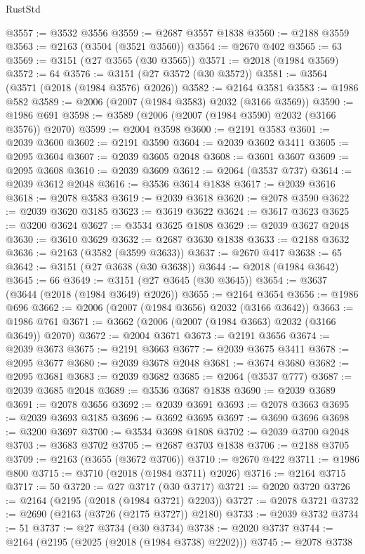 \begin{lexlean}{RustStd}
\begin{coremodule}
@3557 := @3532 @3556
@3559 := @2687 @3557 @1838
@3560 := @2188 @3559
@3563 := @2163 (@3504 (@3521 @3560))
@3564 := @2670 @402
@3565 := 63
@3569 := @3151 (@27 @3565 (@30 @3565))
@3571 := @2018 (@1984 @3569)
@3572 := 64
@3576 := @3151 (@27 @3572 (@30 @3572))
@3581 := @3564 (@3571 (@2018 (@1984 @3576) @2026))
@3582 := @2164 @3581
@3583 := @1986 @582
@3589 := @2006 (@2007 (@1984 @3583) @2032 (@3166 @3569))
@3590 := @1986 @691
@3598 := @3589 (@2006 (@2007 (@1984 @3590) @2032 (@3166 @3576)) @2070)
@3599 := @2004 @3598
@3600 := @2191 @3583
@3601 := @2039 @3600
@3602 := @2191 @3590
@3604 := @2039 @3602 @3411
@3605 := @2095 @3604
@3607 := @2039 @3605 @2048
@3608 := @3601 @3607
@3609 := @2095 @3608
@3610 := @2039 @3609
@3612 := @2064 (@3537 @737)
@3614 := @2039 @3612 @2048
@3616 := @3536 @3614 @1838
@3617 := @2039 @3616
@3618 := @2078 @3583
@3619 := @2039 @3618
@3620 := @2078 @3590
@3622 := @2039 @3620 @3185
@3623 := @3619 @3622
@3624 := @3617 @3623
@3625 := @3200 @3624
@3627 := @3534 @3625 @1808
@3629 := @2039 @3627 @2048
@3630 := @3610 @3629
@3632 := @2687 @3630 @1838
@3633 := @2188 @3632
@3636 := @2163 (@3582 (@3599 @3633))
@3637 := @2670 @417
@3638 := 65
@3642 := @3151 (@27 @3638 (@30 @3638))
@3644 := @2018 (@1984 @3642)
@3645 := 66
@3649 := @3151 (@27 @3645 (@30 @3645))
@3654 := @3637 (@3644 (@2018 (@1984 @3649) @2026))
@3655 := @2164 @3654
@3656 := @1986 @696
@3662 := @2006 (@2007 (@1984 @3656) @2032 (@3166 @3642))
@3663 := @1986 @761
@3671 := @3662 (@2006 (@2007 (@1984 @3663) @2032 (@3166 @3649)) @2070)
@3672 := @2004 @3671
@3673 := @2191 @3656
@3674 := @2039 @3673
@3675 := @2191 @3663
@3677 := @2039 @3675 @3411
@3678 := @2095 @3677
@3680 := @2039 @3678 @2048
@3681 := @3674 @3680
@3682 := @2095 @3681
@3683 := @2039 @3682
@3685 := @2064 (@3537 @777)
@3687 := @2039 @3685 @2048
@3689 := @3536 @3687 @1838
@3690 := @2039 @3689
@3691 := @2078 @3656
@3692 := @2039 @3691
@3693 := @2078 @3663
@3695 := @2039 @3693 @3185
@3696 := @3692 @3695
@3697 := @3690 @3696
@3698 := @3200 @3697
@3700 := @3534 @3698 @1808
@3702 := @2039 @3700 @2048
@3703 := @3683 @3702
@3705 := @2687 @3703 @1838
@3706 := @2188 @3705
@3709 := @2163 (@3655 (@3672 @3706))
@3710 := @2670 @422
@3711 := @1986 @800
@3715 := @3710 (@2018 (@1984 @3711) @2026)
@3716 := @2164 @3715
@3717 := 50
@3720 := @27 @3717 (@30 @3717)
@3721 := @2020 @3720
@3726 := @2164 (@2195 (@2018 (@1984 @3721) @2203))
@3727 := @2078 @3721
@3732 := @2690 (@2163 (@3726 (@2175 @3727)) @2180)
@3733 := @2039 @3732
@3734 := 51
@3737 := @27 @3734 (@30 @3734)
@3738 := @2020 @3737
@3744 := @2164 (@2195 (@2025 (@2018 (@1984 @3738) @2202)))
@3745 := @2078 @3738

\end{coremodule}
\end{lexlean}
